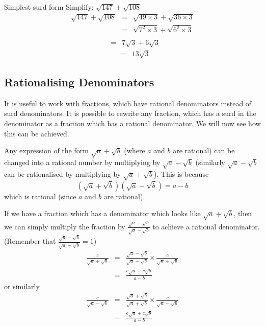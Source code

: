 \begin{wex}{Simplest surd form}
{Simplify: $\sqrt{147} + \sqrt{108}$}{
\begin{eqnarray*}
\sqrt{147} + \sqrt{108} &=& \sqrt{49\times 3} + \sqrt{36\times 3}\\
&=& \sqrt{7^{2}\times 3} + \sqrt{6^{2}\times 3}\\
\end{eqnarray*}
\begin{eqnarray*}
&=& 7\sqrt{3} + 6\sqrt{3}
\end{eqnarray*}
\begin{eqnarray*}
&=& 13\sqrt{3}
\end{eqnarray*}
}
\end{wex}


\subsection{Rationalising Denominators}
It is useful to work with fractions, which have rational denominators instead of surd denominators. It is possible to rewrite any fraction, which has a surd in the denominator as a fraction which has a rational denominator. We will now see how this can be achieved.

Any expression of the form $\sqrt{a}+\sqrt{b}$ (where $a$ and $b$ are rational)
can be changed into a rational number by multiplying by $\sqrt{a}-\sqrt{b}$
(similarly $\sqrt{a}-\sqrt{b}$ can be rationalised by multiplying by
$\sqrt{a}+\sqrt{b}$). This is because
\begin{equation}
\label{eq:mn:s:rat}
(\sqrt{a}+\sqrt{b})(\sqrt{a}-\sqrt{b})=a-b
\end{equation}
which is rational (since $a$ and $b$ are rational).

If we have a fraction which has a denominator which looks like
$\sqrt{a}+\sqrt{b}$, then we can simply multiply the fraction by
$\frac{\sqrt{a}-\sqrt{b}}{\sqrt{a}-\sqrt{b}}$ to achieve a rational denominator. (Remember that $\frac{\sqrt{a}-\sqrt{b}}{\sqrt{a}-\sqrt{b}} = 1$)
\begin{eqnarray}
\label{eq:mn:s:rat:frac1}
\frac{c}{\sqrt a+\sqrt b}&=&\frac{\sqrt{a}-\sqrt{b}}{\sqrt{a}-\sqrt{b}}
\times\frac{c}{\sqrt a+\sqrt b}\\\nonumber
&=&\frac{c\sqrt{a}-c\sqrt{b}}{a-b}
\end{eqnarray}
or similarly
\begin{eqnarray}
\label{eq:mn:s:rat:frac2}
\frac{c}{\sqrt a-\sqrt b}&=&\frac{\sqrt{a}+\sqrt{b}}{\sqrt{a}+\sqrt{b}}
\times\frac{c}{\sqrt a-\sqrt b}\\\nonumber
&=&\frac{c\sqrt{a}+c\sqrt{b}}{a-b}
\end{eqnarray}

